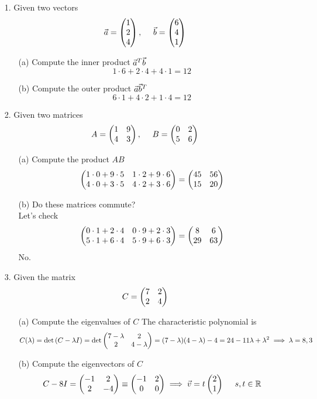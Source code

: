 \documentclass[english, 11pt]{article}
\begin{document}
     \begin{itemize}
       \item[1.] Given two vectors
       \[ \vec{a} = \left(\begin{matrix}1 \\ 2 \\ 4\end{matrix}\right), \ \ \ \  \vec{b} = \left(\begin{matrix}6 \\ 4 \\ 1\end{matrix}\right) \]
       \begin{itemize}
         \item[(a)] Compute the inner product $\vec{a}^T\vec{b}$ \\
           \[ 1\cdot6 + 2\cdot4 + 4\cdot 1 = 12 \]
         \item[(b)] Compute the outer product $\vec{a}\vec{b}^T$
           \[ 6 \cdot 1 + 4\cdot2 + 1\cdot4 = 12 \]
       \end{itemize}
       \item[2.] Given two matrices
       \[ A = \left(\begin{matrix}1 & 9 \\ 4 & 3\end{matrix}\right), \ \ \ \ B = \left(\begin{matrix}0 & 2 \\ 5 & 6\end{matrix}\right) \]
       \begin{itemize}
         \item[(a)] Compute the product $AB$
           \[ \left(\begin{matrix}1\cdot0 + 9\cdot5 & 1 \cdot2 + 9\cdot 6 \\ 4 \cdot 0 + 3 \cdot 5 & 4 \cdot 2 + 3 \cdot 6\end{matrix}\right) = \left(\begin{matrix}45 & 56 \\ 15 & 20\end{matrix}\right)\]
         \item[(b)] Do these matrices commute? \\
           Let's check
           \[ \left(\begin{matrix} 0 \cdot 1 + 2 \cdot 4 & 0 \cdot 9 + 2 \cdot 3 \\ 5\cdot1 + 6 \cdot 4 &  5 \cdot 9 + 6\cdot 3 \end{matrix}\right) = \left(\begin{matrix}8 & 6 \\ 29 & 63\end{matrix}\right) \]
           No.
       \end{itemize}
       \item[3.] Given the matrix
       \[ C = \left(\begin{matrix}7 & 2 \\ 2 & 4\end{matrix}\right) \]
       \begin{itemize}
         \item[(a)] Compute the eigenvalues of $C$
           The characteristic polynomial is
           \[ C(\lambda) = \det{(C - \lambda I)} = \det \left(\begin{matrix}7 - \lambda & 2 \\ 2 & 4 - \lambda\end{matrix}\right) = (7-\lambda)(4-\lambda) - 4  = 24 -11\lambda + \lambda^2 \implies \lambda = 8, 3 \]
         \item[(b)] Compute the eigenvectors of $C$
           \[ C - 8I = \mtx{-1 & 2 \\ 2 & -4 } \equiv \mtx{-1 & 2 \\ 0 & 0} \implies \vv = t\mtx{2 \\ 1} \ \ \ \ s, t \in \R\]

\end{itemize}
\end{itemize}
\end{document}

